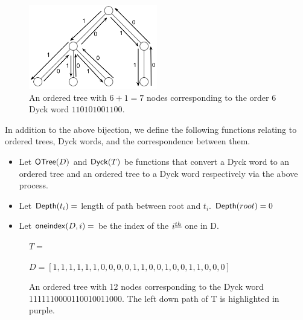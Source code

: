 \begin{figure}
    \centering
    \includegraphics[width=0.5\textwidth]{otreebij.png}
    \caption{An ordered tree with $6+1=7$ nodes corresponding to the order 6 Dyck word $110101001100$.}
    \label{ordered_tree_bijection_illustration}
\end{figure}


In addition to the above bijection, we define the following functions relating to ordered trees, Dyck words, and the correspondence between them.

\begin{itemize}
    \item Let $\mathsf{OTree}{(D)}$ and $\mathsf{Dyck}{(T)}$ be functions that convert a Dyck word to an ordered tree and an ordered tree to a Dyck word respectively via the above process.
    \item Let $\mathsf{Depth}{(t_i)}=$ length of path between root and $t_i$. $\mathsf{Depth}{(root)}=0$
    \item Let $\mathsf{oneindex}({D}, i)=$ be the index of the $i^{\underline{th}}{}$ one in D.
\end{itemize}

\bigskip

\begin{figure}
    \centering
    $T=$


    $D=[1, 1, 1, 1, 1, 1, 0, 0, 0, 0, 1, 1, 0, 0, 1, 0, 0, 1, 1, 0, 0, 0]$
    \caption{An ordered tree with 12 nodes corresponding to the Dyck word 1111110000110010011000.  The left down path of T is highlighted in purple. }
    \label{exampleotree}
\end{figure}

